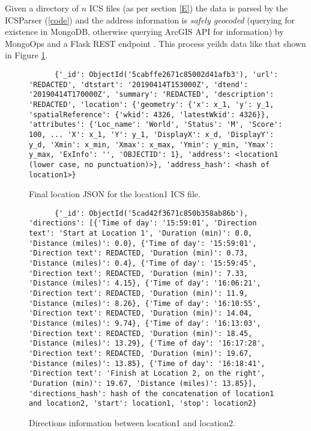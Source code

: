 \documentclass[letterpaper,11pt]{report}
\theoremstyle{definition}
\theoremstyle{definition}
\begin{document}
Given a directory of $n$ ICS files (as per section \ref{E}) the data is parsed by the ICSParser (\ref{code}) and the address information is \emph{safely geocoded} (querying for existence in MongoDB, otherwise querying ArcGIS API for information) by MongoOps and a Flask REST endpoint \cite{Flask}. This process yeilds data like that shown in Figure \ref{location1_data}.
\begin{figure}[!htb]
  \begin{center}
    \begin{lstlisting}
      {'_id': ObjectId('5cabffe2671c85002d41afb3'), 'url': 'REDACTED', 'dtstart': '20190414T153000Z', 'dtend': '20190414T170000Z', 'summary': 'REDACTED', 'description': 'REDACTED', 'location': {'geometry': {'x': x_1, 'y': y_1, 'spatialReference': {'wkid': 4326, 'latestWkid': 4326}}, 'attributes': {'Loc_name': 'World', 'Status': 'M', 'Score': 100, ... 'X': x_1, 'Y': y_1, 'DisplayX': x_d, 'DisplayY': y_d, 'Xmin': x_min, 'Xmax': x_max, 'Ymin': y_min, 'Ymax': y_max, 'ExInfo': '', 'OBJECTID': 1}, 'address': <location1 (lower case, no punctuation)>}, 'address_hash': <hash of location1>}
    \end{lstlisting}
    \caption{Final location JSON for the location1 ICS file.}\label{location1_data}
  \end{center}
\end{figure}


\begin{figure}
  \begin{center}
    \begin{lstlisting}
      {'_id': ObjectId('5cad42f3671c850b358ab86b'), 'directions': [{'Time of day': '15:59:01', 'Direction text': 'Start at Location 1', 'Duration (min)': 0.0, 'Distance (miles)': 0.0}, {'Time of day': '15:59:01', 'Direction text': REDACTED, 'Duration (min)': 0.73, 'Distance (miles)': 0.4}, {'Time of day': '15:59:45', 'Direction text': REDACTED, 'Duration (min)': 7.33, 'Distance (miles)': 4.15}, {'Time of day': '16:06:21', 'Direction text': REDACTED, 'Duration (min)': 11.9, 'Distance (miles)': 8.26}, {'Time of day': '16:10:55', 'Direction text': REDACTED, 'Duration (min)': 14.04, 'Distance (miles)': 9.74}, {'Time of day': '16:13:03', 'Direction text': REDACTED, 'Duration (min)': 18.45, 'Distance (miles)': 13.29}, {'Time of day': '16:17:28', 'Direction text': REDACTED, 'Duration (min)': 19.67, 'Distance (miles)': 13.85}, {'Time of day': '16:18:41', 'Direction text': 'Finish at Location 2, on the right', 'Duration (min)': 19.67, 'Distance (miles)': 13.85}], 'directions_hash': hash of the concatenation of location1 and location2, 'start': location1, 'stop': location2}
    \end{lstlisting}
    \caption{Directions information between location1 and location2.}\label{location1_location2_directions}
  \end{center}
\end{figure}
\end{document}
